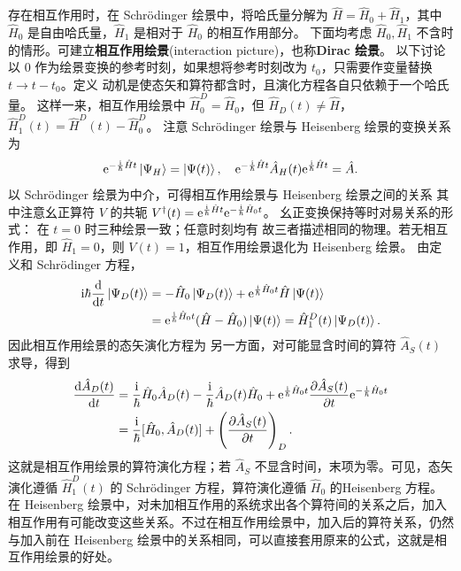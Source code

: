 存在相互作用时，在 Schr\"odinger 绘景中，将哈氏量分解为 $\hat H = \hat H_0 + \hat H_1$，其中 $\hat H_0$ 是自由哈氏量，$\hat H_1$ 是相对于 $\hat H_0$ 的相互作用部分。
下面均考虑 $\hat H_0,\hat H_1$ 不含时的情形。可建立\textbf{相互作用绘景}(interaction picture)，也称\textbf{Dirac 绘景}。
以下讨论以 $0$ 作为绘景变换的参考时刻，如果想将参考时刻改为 $t_0$，只需要作变量替换 $t\to t- t_0$。定义
动机是使态矢和算符都含时，且演化方程各自只依赖于一个哈氏量。
这样一来，相互作用绘景中 $\hat H_0^D = \hat H_0$，但 $\hat H_D(t)\ne\hat H$，$\hat H_1^D(t) = \hat H^D(t) - \hat H_0^D$。
注意 Schr\"odinger 绘景与 Heisenberg 绘景的变换关系为
\[
    \mathrm{e}^{-\frac{\mathrm{i}}{\hbar}\hat H t}\ket{\Psi_H}=\ket{\Psi(t)},\quad
    \mathrm{e}^{-\frac{\mathrm{i}}{\hbar}\hat H t}\hat A_H(t)\mathrm{e}^{\frac{\mathrm{i}}{\hbar}\hat H t}=\hat A.
\]
以 Schr\"odinger 绘景为中介，可得相互作用绘景与 Heisenberg 绘景之间的关系
其中注意幺正算符 $V$ 的共轭 $V^\dagger(t)=\mathrm{e}^{\frac{\mathrm{i}}{\hbar}\hat H t}\mathrm{e}^{-\frac{\mathrm{i}}{\hbar}\hat H_0 t}$。
幺正变换保持等时对易关系的形式：
在 $t=0$ 时三种绘景一致；任意时刻均有
故三者描述相同的物理。若无相互作用，即 $\hat H_1=0$，则 $V(t)=1$，相互作用绘景退化为 Heisenberg 绘景。
由定义和 Schr\"odinger 方程，
\begin{align*}
    \mathrm{i}\hbar\dv{t}\ket{\Psi_D(t)}
    &=
    -\hat H_0\ket{\Psi_D(t)}
    +\mathrm{e}^{\frac{\mathrm{i}}{\hbar}\hat H_0 t}\hat H\ket{\Psi(t)}\\
    &=
    \mathrm{e}^{\frac{\mathrm{i}}{\hbar}\hat H_0 t}(\hat H-\hat H_0)\ket{\Psi(t)}
    =\hat H_1^D(t)\ket{\Psi_D(t)}.
\end{align*}
因此相互作用绘景的态矢演化方程为
另一方面，对可能显含时间的算符 $\hat A_S(t)$ 求导，得到
\begin{align*}
    \dv{\hat A_D(t)}{t}
    &=
    \frac{\mathrm{i}}{\hbar}\hat H_0\hat A_D(t)
    -\frac{\mathrm{i}}{\hbar}\hat A_D(t)\hat H_0
    +\mathrm{e}^{\frac{\mathrm{i}}{\hbar}\hat H_0 t}
    \pdv{\hat A_S(t)}{t}
    \mathrm{e}^{-\frac{\mathrm{i}}{\hbar}\hat H_0 t}\\
    &=
    \frac{\mathrm{i}}{\hbar}[\hat H_0,\hat A_D(t)]
    +\left(\pdv{\hat A_S(t)}{t}\right)_D.
\end{align*}
这就是相互作用绘景的算符演化方程；若 $\hat A_S$ 不显含时间，末项为零。可见，态矢演化遵循 $\hat H_1^D(t)$ 的 Schr\"odinger 方程，算符演化遵循 $\hat H_0$ 的Heisenberg 方程。
在 Heisenberg 绘景中，对未加相互作用的系统求出各个算符间的关系之后，加入相互作用有可能改变这些关系。不过在相互作用绘景中，加入后的算符关系，仍然与加入前在 Heisenberg 绘景中的关系相同，可以直接套用原来的公式，这就是相互作用绘景的好处。

